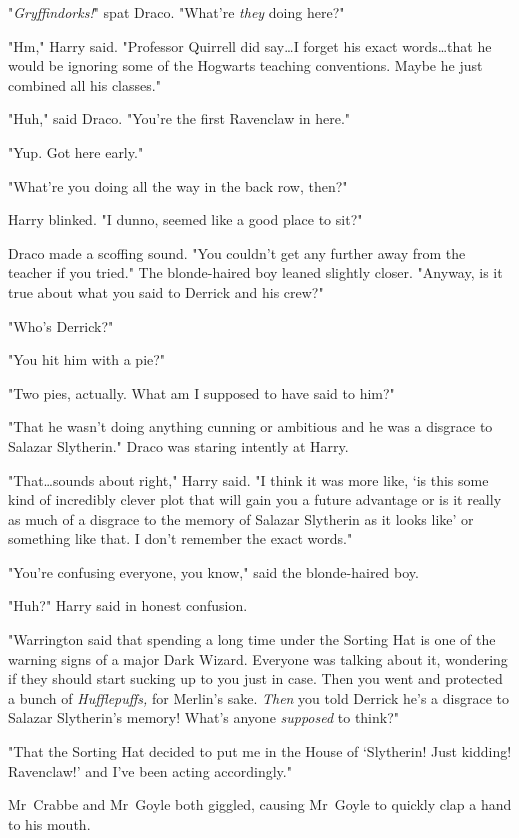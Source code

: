 "\emph{Gryffindorks!}" spat Draco. "What’re \emph{they} doing here?"

"Hm," Harry said. "Professor Quirrell did say…I forget his exact
words…that he would be ignoring some of the Hogwarts teaching
conventions. Maybe he just combined all his classes."

"Huh," said Draco. "You’re the first Ravenclaw in here."

"Yup. Got here early."

"What’re you doing all the way in the back row, then?"

Harry blinked. "I dunno, seemed like a good place to sit?"

Draco made a scoffing sound. "You couldn’t get any further away from the
teacher if you tried." The blonde-haired boy leaned slightly closer. "Anyway,
is it true about what you said to Derrick and his crew?"

"Who’s Derrick?"

"You hit him with a pie?"

"Two pies, actually. What am I supposed to have said to him?"

"That he wasn’t doing anything cunning or ambitious and he was a disgrace to
Salazar Slytherin." Draco was staring intently at Harry.

"That…sounds about right," Harry said. "I think it was more like, ‘is
this some kind of incredibly clever plot that will gain you a future advantage
or is it really as much of a disgrace to the memory of Salazar Slytherin as it
looks like’ or something like that. I don’t remember the exact words."

"You’re confusing everyone, you know," said the blonde-haired boy.

"Huh?" Harry said in honest confusion.

"Warrington said that spending a long time under the Sorting Hat is one of the
warning signs of a major Dark Wizard. Everyone was talking about it, wondering
if they should start sucking up to you just in case. Then you went and
protected a bunch of \emph{Hufflepuffs,} for Merlin’s sake. \emph{Then} you
told Derrick he’s a disgrace to Salazar Slytherin’s memory! What’s anyone
\emph{supposed} to think?"

"That the Sorting Hat decided to put me in the House of ‘Slytherin! Just
kidding! Ravenclaw!’ and I’ve been acting accordingly."

Mr~Crabbe and Mr~Goyle both giggled, causing Mr~Goyle to quickly clap a hand
to his mouth.

